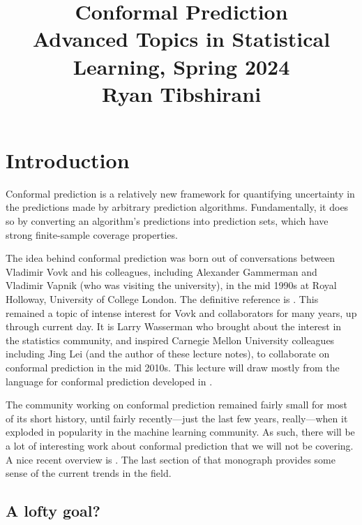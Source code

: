 \documentclass{article}
\title{Conformal Prediction \\ \smallskip
\large Advanced Topics in Statistical Learning, Spring 2024 \\ \smallskip
Ryan Tibshirani }
\date{}
\begin{document}
\maketitle
\RaggedRight
\vspace{-50pt}

\section{Introduction}

Conformal prediction is a relatively new framework for quantifying uncertainty
in the predictions made by arbitrary prediction algorithms. Fundamentally, it
does so by converting an algorithm's predictions into prediction sets, which
have strong finite-sample coverage properties. 

The idea behind conformal prediction was born out of conversations between
Vladimir Vovk and his colleagues, including Alexander Gammerman and Vladimir
Vapnik (who was visiting the university), in the mid 1990s at Royal Holloway,
University of College London. The definitive reference is
\citet{vovk2005algorithmic}. This remained a topic of intense interest for Vovk
and collaborators for many years, up through current day. It is Larry Wasserman
who brought about the interest in the statistics community, and inspired
Carnegie Mellon University colleagues including Jing Lei (and the author of
these lecture notes), to collaborate on conformal prediction in the mid
2010s. This lecture will draw mostly from the language for conformal prediction
developed in \citet{lei2018distribution, tibshirani2019conformal}.    

The community working on conformal prediction remained fairly small for most of
its short history, until fairly recently---just the last few years,
really---when it exploded in popularity in the machine learning community. As
such, there will be a lot of interesting work about conformal prediction that
we will not be covering. A nice recent overview is
\citet{angelopoulos2023gentle}. The last section of that monograph provides some 
sense of the current trends in the field.      

\subsection{A lofty goal?}

\def\hC{\hat{C}}
\def\hq{\hat{q}}
\def\Quantile{\mathrm{Quantile}}
\end{document}

